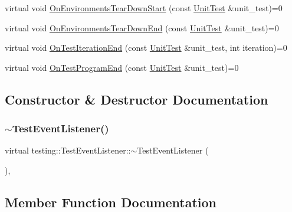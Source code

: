 \begin{DoxyCompactItemize}
\item 
virtual void \mbox{\hyperlink{classtesting_1_1TestEventListener_a468b5e6701bcb86cb2c956caadbba5e4}{On\+Environments\+Tear\+Down\+Start}} (const \mbox{\hyperlink{classtesting_1_1UnitTest}{Unit\+Test}} \&unit\+\_\+test)=0
\item 
virtual void \mbox{\hyperlink{classtesting_1_1TestEventListener_a9ea04fa7f447865ba76df35e12ba2092}{On\+Environments\+Tear\+Down\+End}} (const \mbox{\hyperlink{classtesting_1_1UnitTest}{Unit\+Test}} \&unit\+\_\+test)=0
\item 
virtual void \mbox{\hyperlink{classtesting_1_1TestEventListener_a550fdb3e55726e4cefa09f5697941425}{On\+Test\+Iteration\+End}} (const \mbox{\hyperlink{classtesting_1_1UnitTest}{Unit\+Test}} \&unit\+\_\+test, int iteration)=0
\item 
virtual void \mbox{\hyperlink{classtesting_1_1TestEventListener_ad15b6246d94c268e233487a86463ef3d}{On\+Test\+Program\+End}} (const \mbox{\hyperlink{classtesting_1_1UnitTest}{Unit\+Test}} \&unit\+\_\+test)=0
\end{DoxyCompactItemize}


\subsection{Constructor \& Destructor Documentation}
\mbox{\label{classtesting_1_1TestEventListener_a4512d19e7a108ec4926239ec1ea85d63}} 
\subsubsection{\texorpdfstring{$\sim$TestEventListener()}{~TestEventListener()}}
{\footnotesize\ttfamily virtual testing\+::\+Test\+Event\+Listener\+::$\sim$\+Test\+Event\+Listener (\begin{DoxyParamCaption}{ }\end{DoxyParamCaption})\hspace{0.3cm}{\ttfamily [inline]}, {\ttfamily [virtual]}}



\subsection{Member Function Documentation}
\mbox{\label{classtesting_1_1TestEventListener_aaa1021d75f5dbf3f05c829c1cc520341}} 
